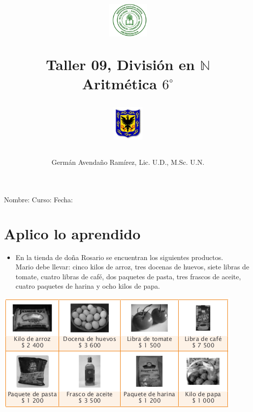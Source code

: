 \documentclass[letterpaper,11pt,twoside]{article}
\author{Germ\'an Avenda\~no Ram\'irez, Lic. U.D., M.Sc. U.N.}
\title{\begin{minipage}{.2\textwidth}
\includegraphics[height=1.75cm]{Images/logo-colegio.png}\end{minipage}
\begin{minipage}{.55\textwidth}
\begin{center}
Taller 09, Divisi\'{o}n en $\mathbb{N}$\\
Aritm\'{e}tica $6^{\circ}$
\end{center}
\end{minipage}\hfill
\begin{minipage}{.2\textwidth}
\includegraphics[height=1.75cm]{Images/logo-sed.png} 
\end{minipage}}
\date{}
\begin{document}
\maketitle
Nombre: \hrulefill Curso: \underline{\hspace*{44pt}} Fecha: \underline{\hspace*{2.5cm}}
 \section*{Aplico lo aprendido}
 \begin{minipage}{.35\textwidth}
  \begin{itemize}
 \item En la tienda de doña Rosario se encuentran los
siguientes productos.\\

Mario debe llevar: cinco kilos de arroz, tres docenas de
huevos, siete libras de tomate, cuatro libras de café, dos
paquetes de pasta, tres frascos de aceite, cuatro paquetes
de harina y ocho kilos de papa.
\end{itemize}
 \end{minipage}\hfill
 \begin{minipage}{.65\textwidth}
\begin{center}
\includegraphics[scale=.76]{Images/productos.png} 
\end{center} 
 \end{minipage}
\end{document}
